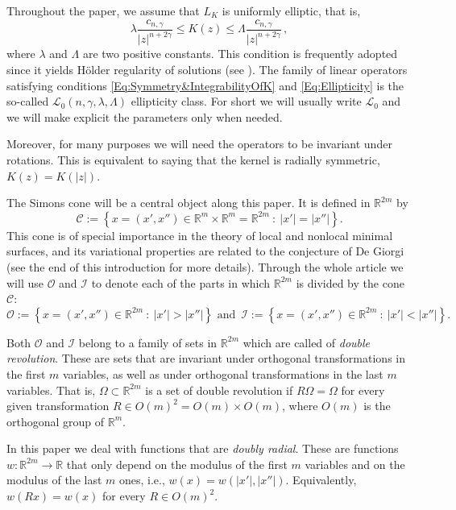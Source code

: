 \documentclass[12pt,reqno]{amsart}
\theoremstyle{definition}
\theoremstyle{remark}
\newcommand{\con}[1]{\mathbb{#1}}
\newcommand{\R}{\con{R}} %
\newcommand{\ccal}{\mathscr{C}}
\newcommand{\ical}{\mathcal{I}}
\newcommand{\lcal}{\mathcal{L}}
\newcommand{\ocal}{\mathcal{O}}
\newcommand{\s}{\gamma}
\newcommand{\setcond}[2]{\left \{ #1 \ : \ #2  \right \}}
\numberwithin{equation}{section}
\begin{document}
Throughout the paper, we assume that $L_K$ is uniformly elliptic, that is,
\begin{equation}
\label{Eq:Ellipticity}
\lambda \dfrac{c_{n,\s}}{|z|^{n+2\s}} \leq K(z) \leq \Lambda \dfrac{c_{n,\s}}{|z|^{n+2\s}}\,, 
\end{equation}
where $\lambda$ and $\Lambda$ are two positive constants. This condition is frequently adopted since it yields Hölder regularity of solutions (see \cite{RosOton-Survey,SerraC2s+alphaRegularity}). The family of linear operators satisfying conditions \eqref{Eq:Symmetry&IntegrabilityOfK} and \eqref{Eq:Ellipticity} is the so-called $\lcal_0(n,\s,\lambda, \Lambda)$ ellipticity class. For short we will usually write $\lcal_0$ and we will make explicit the parameters only when needed. 

Moreover, for many  purposes we will need the operators to be invariant under rotations. This is equivalent to saying that the kernel is radially symmetric, $K(z) = K(|z|)$. 




The Simons cone will be a central object along this paper. It is defined in $\R^{2m}$ by
\begin{equation}
\label{Eq:SimonsCone}
\mathscr{C} := \setcond{x = (x', x'') \in \R^m \times \R^m=\R^{2m}}{|x'| = |x''|}.
\end{equation}
This cone is of special importance in the theory of local and nonlocal minimal surfaces, and its variational properties are related to the conjecture of De Giorgi (see the end of this introduction for more details). Through the whole article we will use $\ocal$ and $\ical$ to denote each of the parts in which $\R^{2m}$ is divided by the cone $\ccal$:
$$
\ocal:= \setcond{x = (x', x'') \in \R^{2m}}{|x'| > |x''|} \textrm{ and } \,
\ical:= \setcond{x = (x', x'') \in \R^{2m}}{|x'| < |x''|}\!.
$$

Both $\ocal$ and $\ical$ belong to a family of sets in $\R^{2m}$ which are called of \emph{double revolution}. These are sets that are invariant under orthogonal transformations in the first $m$ variables, as well as under orthogonal transformations in the last $m$ variables. That is, $\Omega\subset \R^{2m}$ is a set of double revolution if $R\Omega = \Omega$ for every given transformation $R\in O(m)^2 = O(m) \times O(m)$, where  $O(m)$ is the orthogonal group of $\R^m$.

In this paper we deal with functions that are \emph{doubly radial}. These are functions $w:\R^{2m}  \to \R$ that only depend on the modulus of the first $m$ variables and on the modulus of the last $m$ ones, i.e., $w(x) = w(|x'|,|x''|)$. Equivalently, $w(Rx) = w(x)$ for every $R \in O(m)^2$.
\end{document}
